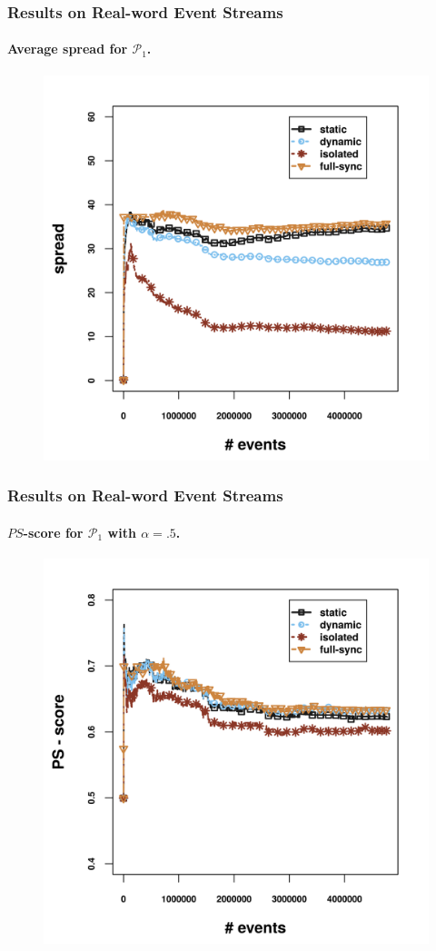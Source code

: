 \begin{frame}
	
	\frametitle{Results on Real-word Event Streams }
	\framesubtitle{Average spread for $\mathcal{P}_1$.}
	
	\begin{center}
		
		\begin{figure}[]
			\centering
			\includegraphics[width=.7\textwidth,height=.65\textheight]{../chapters/figures/synopses/new/spread_p1.png}
			
		\end{figure}
	\end{center}
	
\end{frame}


\begin{frame}
	
	\frametitle{Results on Real-word Event Streams }
	\framesubtitle{$PS$-score for $\mathcal{P}_1$ with $\alpha = .5$.}
	
\begin{center}
	\centering
	\begin{figure}[]
		
		\includegraphics[width=.7\textwidth,height=.65\textheight]{../chapters/figures/synopses/new/ps_score_p1.png}
		
	\end{figure}
\end{center}
\end{frame}

